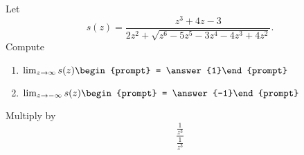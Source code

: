 \documentclass{ximera}
\author{Bart Snapp}
\begin{document}
\begin{exercise}
Let 
\[
s(z) = \frac{z^3+4 z-3}{2 z^2+\sqrt{z^6-5 z^5-3 z^4-4 z^3+4 z^2}}.
\]
Compute
\begin{enumerate}
\item $\lim_{z\to \infty} s(z) \begin{prompt} = \answer{1}\end{prompt}$
\item $\lim_{z\to -\infty}s(z) \begin{prompt} = \answer{-1}\end{prompt}$
\end{enumerate}
\begin{hint}
Multiply by
\[
\frac{\frac{1}{z^3}}{\frac{1}{z^3}}
\]
\end{hint}
\end{exercise}
\end{document}
